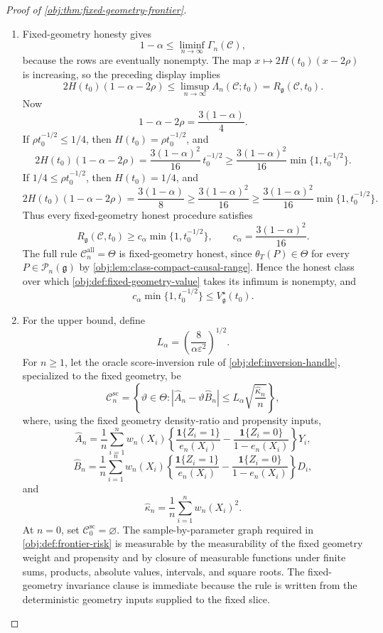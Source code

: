 \begin{proof}[Proof of \cref{obj:thm:fixed-geometry-frontier}]
\begin{enumerate}
\item Fixed-geometry honesty gives
\[
1-\alpha
\le
\liminf_{n\to\infty}\Gamma_n(\mathscr C),
\]
because the rows are eventually nonempty.  The map \(x\mapsto 2H(t_0)(x-2\rho)\) is increasing, so the preceding display implies
\[
2H(t_0)(1-\alpha-2\rho)
\le
\limsup_{n\to\infty}\Lambda_n(\mathscr C;t_0)
=
R_{\mathfrak g}(\mathscr C,t_0).
\]
Now
\[
1-\alpha-2\rho=\frac{3(1-\alpha)}4 .
\]
If \(\rho t_0^{-1/2}\le1/4\), then \(H(t_0)=\rho t_0^{-1/2}\), and
\[
2H(t_0)(1-\alpha-2\rho)
=
\frac{3(1-\alpha)^2}{16}\,t_0^{-1/2}
\ge
\frac{3(1-\alpha)^2}{16}\min\{1,t_0^{-1/2}\}.
\]
If \(1/4\le\rho t_0^{-1/2}\), then \(H(t_0)=1/4\), and
\[
2H(t_0)(1-\alpha-2\rho)
=
\frac{3(1-\alpha)}8
\ge
\frac{3(1-\alpha)^2}{16}
\ge
\frac{3(1-\alpha)^2}{16}\min\{1,t_0^{-1/2}\}.
\]
Thus every fixed-geometry honest procedure satisfies
\[
R_{\mathfrak g}(\mathscr C,t_0)
\ge
c_\alpha\min\{1,t_0^{-1/2}\},
\qquad
c_\alpha=\frac{3(1-\alpha)^2}{16}.
\]
The full rule \(\mathscr C_n^{\mathrm{all}}=\Theta\) is fixed-geometry honest, since \(\theta_T(P)\in\Theta\) for every \(P\in\mathcal P_n(\mathfrak g)\) by \cref{obj:lem:class-compact-causal-range}.  Hence the honest class over which \cref{obj:def:fixed-geometry-value} takes its infimum is nonempty, and
\[
c_\alpha\min\{1,t_0^{-1/2}\}
\le
V_{\mathfrak g}^{\star}(t_0).
\]

\item For the upper bound, define
\[
L_\alpha=\left(\frac{8}{\alpha\varepsilon^2}\right)^{1/2}.
\]
For \(n\ge1\), let the oracle score-inversion rule of \cref{obj:def:inversion-handle}, specialized to the fixed geometry, be
\[
\mathscr C_n^{\mathrm{sc}}
=
\left\{\vartheta\in\Theta:
\left|\widehat A_n-\vartheta\widehat B_n\right|
\le
L_\alpha\sqrt{\frac{\widehat\kappa_n}{n}}
\right\},
\]
where, using the fixed geometry density-ratio and propensity inputs,
\[
\widehat A_n
=
\frac1n\sum_{i=1}^n
w_n(X_i)
\left\{\frac{\mathbf 1\{Z_i=1\}}{e_n(X_i)}
-
\frac{\mathbf 1\{Z_i=0\}}{1-e_n(X_i)}
\right\}Y_i,
\]
\[
\widehat B_n
=
\frac1n\sum_{i=1}^n
w_n(X_i)
\left\{\frac{\mathbf 1\{Z_i=1\}}{e_n(X_i)}
-
\frac{\mathbf 1\{Z_i=0\}}{1-e_n(X_i)}
\right\}D_i,
\]
and
\[
\widehat\kappa_n
=
\frac1n\sum_{i=1}^n w_n(X_i)^2 .
\]
At \(n=0\), set \(\mathscr C_0^{\mathrm{sc}}=\varnothing\).  The sample-by-parameter graph required in \cref{obj:def:frontier-risk} is measurable by the measurability of the fixed geometry weight and propensity and by closure of measurable functions under finite sums, products, absolute values, intervals, and square roots.  The fixed-geometry invariance clause is immediate because the rule is written from the deterministic geometry inputs supplied to the fixed slice.


\end{enumerate}
\end{proof}
